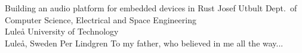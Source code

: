 \documentclass[12pt,a4paper,openright,final,twoside]{LTU-Report-Theme/cseethesis}
\begin{document}





\def\thesistitle{Building an audio platform for embedded devices in Rust}

\def\theauthor{Josef Utbult}
\def\theaddress{Dept.\ of Computer Science, Electrical and Space Engineering\\
Luleå University of Technology\\ Luleå, Sweden}

\def\supervisors{Per Lindgren}

\def\supervisorstring{Supervisor:} 

\def\dedication{To my father, who believed in me all the way...}

\def\theabstract{}
\def\thepreface{}

\createpreamble
  {\thesistitle}
  {\theauthor}
  {\theaddress}
  {\supervisors}
  {\dedication}
  {\theabstract}
  {\thepreface}

\startchapters
\begin{bibunit}[IEEEtran]

	
	
	
	
	
	
	

	\makebib
\end{bibunit}
\end{document}
